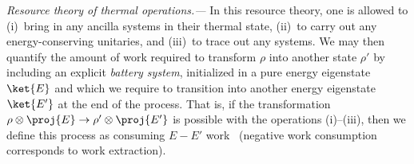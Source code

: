 \documentclass[prl,reprint,longbibliography,superscriptaddress]{revtex4-1}
\renewcommand\paragraph[1]{%
  \par\emph{#1.---}\kern2pt\relax\ignorespaces}
\begin{document}
\paragraph{Resource theory of thermal operations}%
In this resource theory, one is allowed to (i)~bring in any ancilla systems in
their thermal state, (ii)~to carry out any energy-conserving unitaries, and
(iii)~to trace out any systems.
%
We may then quantify the amount of work required to transform $\rho$ into
another state $\rho'$ by including an explicit \emph{battery system},
initialized in a pure energy eigenstate $\ket{E}$ and which we require to
transition into another energy eigenstate $\ket{E'}$ at the end of the process.
That is, if the transformation $\rho\otimes\proj{E} \to \rho'\otimes\proj{E'}$
is possible with the operations (i)--(iii), then we define this process as
consuming $E-E'$ work~\cite{Horodecki2013_ThermoMaj,%
  Skrzypczyk2014NComm_individual,Faist2018PRX_workcost} (negative work
consumption corresponds to work extraction).
\end{document}
